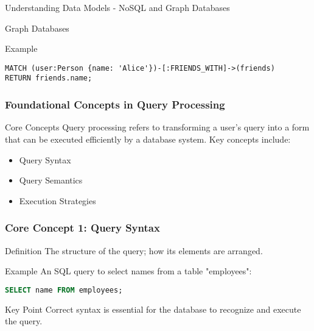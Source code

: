 \documentclass[aspectratio=169]{beamer}
\begin{document}
\begin{frame}[fragile]{Understanding Data Models - NoSQL and Graph Databases}
\begin{block}{Graph Databases}
        \begin{block}{Example}
            \begin{lstlisting}[language=cypher]
MATCH (user:Person {name: 'Alice'})-[:FRIENDS_WITH]->(friends)
RETURN friends.name;
            \end{lstlisting}
        \end{block}
    \end{block}
\end{frame}

\begin{frame}[fragile]
    \frametitle{Foundational Concepts in Query Processing}
    \begin{block}{Core Concepts}
        Query processing refers to transforming a user's query into a form that can be executed efficiently by a database system. Key concepts include:
    \end{block}
    \begin{itemize}
        \item Query Syntax
        \item Query Semantics
        \item Execution Strategies
    \end{itemize}
\end{frame}

\begin{frame}[fragile]
    \frametitle{Core Concept 1: Query Syntax}
    \begin{block}{Definition}
        The structure of the query; how its elements are arranged.
    \end{block}
    \begin{exampleblock}{Example}
        An SQL query to select names from a table "employees":
        \begin{lstlisting}[language=SQL]
SELECT name FROM employees;
        \end{lstlisting}
    \end{exampleblock}
    \begin{block}{Key Point}
        Correct syntax is essential for the database to recognize and execute the query.
    \end{block}
\end{frame}
\end{document}
